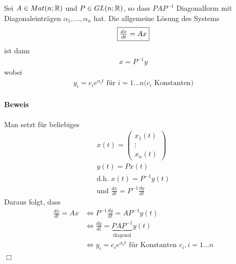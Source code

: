\begin{satz} %
\label{satz411}
Sei $A \in Mat(n; \mathbb{R})$ und $P \in GL(n; \mathbb{R})$, so dass $PAP^{-1}$ Diagonalform mit Diagonaleinträgen $\alpha_1, ..., \alpha_n$ hat.
Die allgemeine Lösung des Systems
\begin{align}
\fbox{$\frac{dx}{dt} = Ax$}
\end{align}
ist dann
\begin{align}
x = P^{-1} y
\end{align}
wobei 
\begin{align}
 y_i = c_i e^{\alpha_i t} \text{ für } i = 1...n \text{($c_i$ Konstanten)}
\end{align}
\end{satz}

\paragraph{Beweis}
Man setzt für beliebiges 
\begin{align}
 x(t) = \begin{pmatrix} x_1(t) \\ \vdots \\ x_n(t) \end{pmatrix} \\
 y(t) = Px(t) \\
 \text{d.h. } x(t) = P^{-1} y(t) \\
 \text{und } \frac{dx}{dt} = P^{-1} \frac{dy}{dt}
\end{align}
Daraus folgt, dass
\begin{align}
\frac{dx}{dt} = Ax &\Leftrightarrow P^{-1} \frac{dy}{dt} = AP^{-1} y(t) \\
&\Leftrightarrow \frac{dy}{dt} = \underbrace{PAP^{-1}}_{\text{diagonal}} y(t) \\
&\Leftrightarrow y_i = c_i e^{\alpha_i t} \text{ für Konstanten } c_i, i=1...n
\end{align}
\hspace*{1cm} \hfill $\Box$

